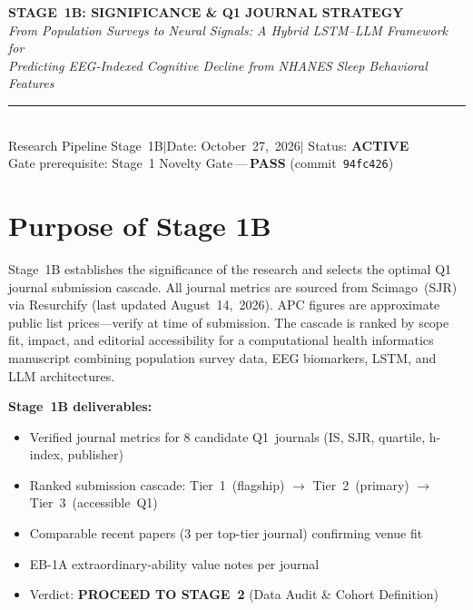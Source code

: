 \documentclass[a4paper,11pt]{article}
\begin{document}

\begin{center}
  {\LARGE\bfseries\color{navyblue}STAGE~1B: SIGNIFICANCE \& Q1 JOURNAL STRATEGY}\\[0.55em]
  {\large\itshape
    From Population Surveys to Neural Signals: A Hybrid LSTM--LLM Framework for\\[0.2em]
    Predicting EEG-Indexed Cognitive Decline from NHANES Sleep Behavioral Features}\\[0.4em]
  \textcolor{navyblue}{\rule{\linewidth}{1.5pt}}\\[0.3em]
  {\small
    Research Pipeline Stage~1B\quad$|$\quad Date: October~27,~2026\quad$|$\quad
    Status: \textbf{ACTIVE}}\\[0.15em]
  {\small Gate prerequisite: Stage~1 Novelty Gate\,---\,\textbf{PASS}
    (commit~\texttt{94fc426})}
\end{center}

\vspace{0.4em}

\section{Purpose of Stage 1B}

Stage~1B establishes the significance of the research and selects the optimal Q1 journal
submission cascade. All journal metrics are sourced from Scimago~(SJR) via Resurchify
(last updated August~14,~2026). APC figures are approximate public list prices---verify
at time of submission. The cascade is ranked by scope fit, impact, and editorial
accessibility for a computational health informatics manuscript combining population
survey data, EEG biomarkers, LSTM, and LLM architectures.

\medskip
\textbf{Stage~1B deliverables:}
\begin{itemize}\setlength{\itemsep}{2pt}
  \item Verified journal metrics for 8 candidate Q1~journals
        (IS, SJR, quartile, h-index, publisher)
  \item Ranked submission cascade:
        Tier~1~(flagship) $\rightarrow$ Tier~2~(primary) $\rightarrow$ Tier~3~(accessible~Q1)
  \item Comparable recent papers (3 per top-tier journal) confirming venue fit
  \item EB-1A extraordinary-ability value notes per journal
  \item Verdict: \textbf{PROCEED TO STAGE~2} (Data Audit \& Cohort Definition)
\end{itemize}
\end{document}

